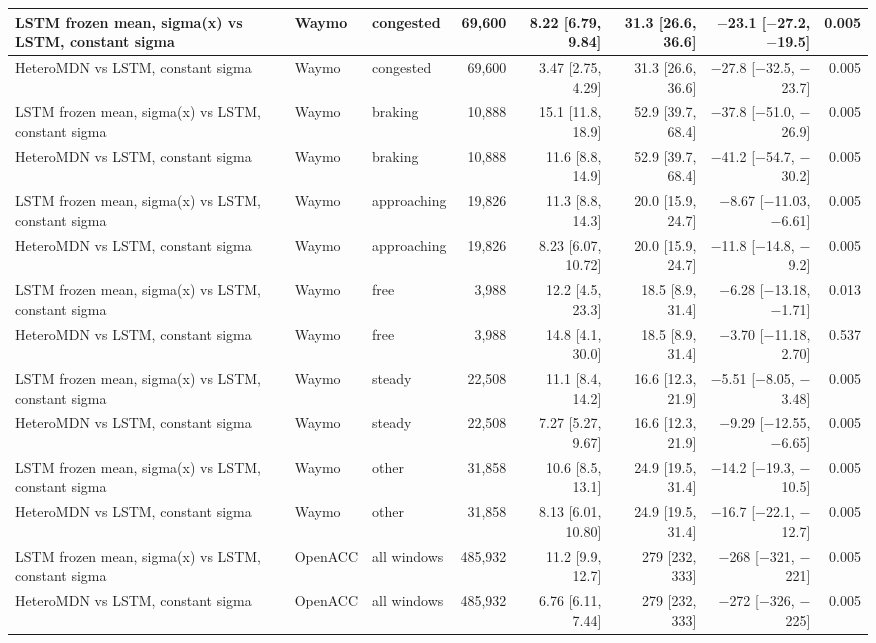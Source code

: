 \begin{longtable}{lllrrrrr}
\midrule
LSTM frozen mean, sigma(x) vs LSTM, constant sigma & Waymo & congested & 69,600 & 8.22 [6.79, 9.84] & 31.3 [26.6, 36.6] & $-$23.1 [$-$27.2, $-$19.5] & 0.005 \\
\midrule
HeteroMDN vs LSTM, constant sigma & Waymo & congested & 69,600 & 3.47 [2.75, 4.29] & 31.3 [26.6, 36.6] & $-$27.8 [$-$32.5, $-$23.7] & 0.005 \\
\midrule
LSTM frozen mean, sigma(x) vs LSTM, constant sigma & Waymo & braking & 10,888 & 15.1 [11.8, 18.9] & 52.9 [39.7, 68.4] & $-$37.8 [$-$51.0, $-$26.9] & 0.005 \\
\midrule
HeteroMDN vs LSTM, constant sigma & Waymo & braking & 10,888 & 11.6 [8.8, 14.9] & 52.9 [39.7, 68.4] & $-$41.2 [$-$54.7, $-$30.2] & 0.005 \\
\midrule
LSTM frozen mean, sigma(x) vs LSTM, constant sigma & Waymo & approaching & 19,826 & 11.3 [8.8, 14.3] & 20.0 [15.9, 24.7] & $-$8.67 [$-$11.03, $-$6.61] & 0.005 \\
\midrule
HeteroMDN vs LSTM, constant sigma & Waymo & approaching & 19,826 & 8.23 [6.07, 10.72] & 20.0 [15.9, 24.7] & $-$11.8 [$-$14.8, $-$9.2] & 0.005 \\
\midrule
LSTM frozen mean, sigma(x) vs LSTM, constant sigma & Waymo & free & 3,988 & 12.2 [4.5, 23.3] & 18.5 [8.9, 31.4] & $-$6.28 [$-$13.18, $-$1.71] & 0.013 \\
\midrule
HeteroMDN vs LSTM, constant sigma & Waymo & free & 3,988 & 14.8 [4.1, 30.0] & 18.5 [8.9, 31.4] & $-$3.70 [$-$11.18, 2.70] & 0.537 \\
\midrule
LSTM frozen mean, sigma(x) vs LSTM, constant sigma & Waymo & steady & 22,508 & 11.1 [8.4, 14.2] & 16.6 [12.3, 21.9] & $-$5.51 [$-$8.05, $-$3.48] & 0.005 \\
\midrule
HeteroMDN vs LSTM, constant sigma & Waymo & steady & 22,508 & 7.27 [5.27, 9.67] & 16.6 [12.3, 21.9] & $-$9.29 [$-$12.55, $-$6.65] & 0.005 \\
\midrule
LSTM frozen mean, sigma(x) vs LSTM, constant sigma & Waymo & other & 31,858 & 10.6 [8.5, 13.1] & 24.9 [19.5, 31.4] & $-$14.2 [$-$19.3, $-$10.5] & 0.005 \\
\midrule
HeteroMDN vs LSTM, constant sigma & Waymo & other & 31,858 & 8.13 [6.01, 10.80] & 24.9 [19.5, 31.4] & $-$16.7 [$-$22.1, $-$12.7] & 0.005 \\
\midrule
LSTM frozen mean, sigma(x) vs LSTM, constant sigma & OpenACC & all windows & 485,932 & 11.2 [9.9, 12.7] & 279 [232, 333] & $-$268 [$-$321, $-$221] & 0.005 \\
\midrule
HeteroMDN vs LSTM, constant sigma & OpenACC & all windows & 485,932 & 6.76 [6.11, 7.44] & 279 [232, 333] & $-$272 [$-$326, $-$225] & 0.005 \\

\end{longtable}
